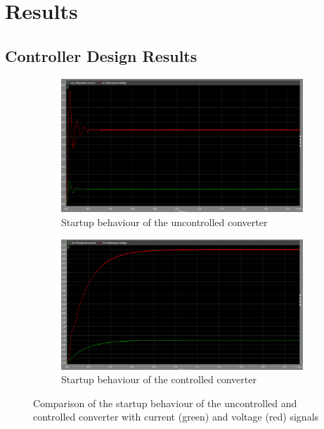 \chapter{Results}
\label{chapter:results}

\section{Controller Design Results}
\label{section:controller_design_results}

\begin{figure}[htbp]
    \centering
    \begin{subfigure}[b]{0.49\textwidth}
        \centering
        \includegraphics[width=\textwidth]{img/v_i_zoomed_constant_load.png}
        \caption{Startup behaviour of the uncontrolled converter}
        \label{fig:v_i_startup_uncontrolled}
    \end{subfigure}
    \hfill
    \begin{subfigure}[b]{0.49\textwidth}
        \centering
        \includegraphics[width=\textwidth]{img/v_i_zoomed_control_constant_load.png}
        \caption{Startup behaviour of the controlled converter}
        \label{fig:v_i_startup_controlled}
    \end{subfigure}
    \caption{Comparison of the startup behaviour of the uncontrolled and controlled converter with current (green) and voltage (red) signals}
    \label{fig:comparison_startup}
\end{figure}

